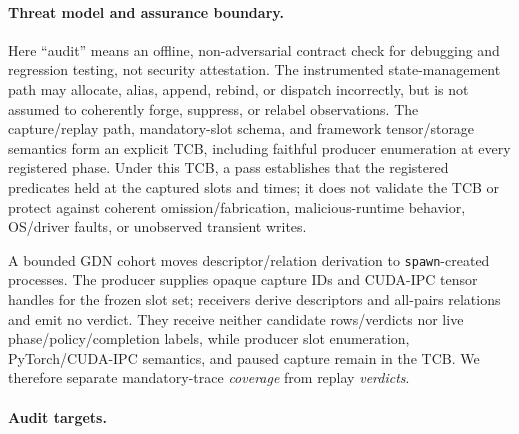 \documentclass{article}
\begin{document}
\paragraph{Threat model and assurance boundary.}
Here ``audit'' means an offline, non-adversarial contract check for debugging
and regression testing, not security attestation.  The instrumented
state-management path may allocate, alias, append, rebind, or dispatch
incorrectly, but is not assumed to coherently forge, suppress, or relabel
observations.  The capture/replay path, mandatory-slot schema, and framework
tensor/storage semantics form an explicit TCB, including faithful producer
enumeration at every registered phase.  Under this TCB, a pass establishes
that the registered predicates held at the captured slots and times; it does
not validate the TCB or protect against coherent omission/fabrication,
malicious-runtime behavior, OS/driver faults, or unobserved transient writes.

A bounded GDN cohort moves descriptor/relation derivation to
\texttt{spawn}-created processes.  The producer supplies opaque capture IDs and
CUDA-IPC tensor handles for the frozen slot set; receivers derive descriptors
and all-pairs relations and emit no verdict.  They receive neither candidate
rows/verdicts nor live phase/policy/completion labels, while producer slot
enumeration, PyTorch/CUDA-IPC semantics, and paused capture remain in the TCB.
We therefore separate mandatory-trace \emph{coverage} from replay
\emph{verdicts}.

\paragraph{Audit targets.}
\end{document}
